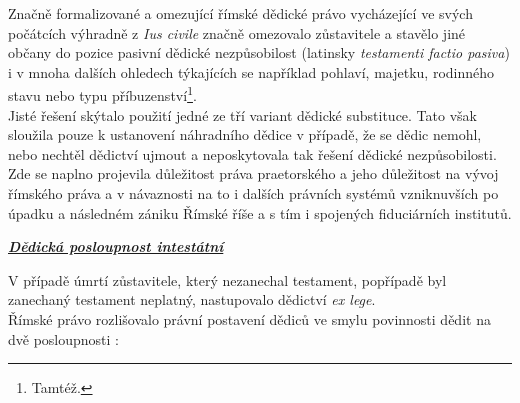 \documentclass{article}
\begin{document}
Značně formalizované a omezující římské dědické právo vycházející ve svých počátcích výhradně z \textit{Ius civile} značně omezovalo zůstavitele a stavělo jiné občany do pozice pasivní dědické nezpůsobilost (latinsky \textit{testamenti factio pasiva}) i v mnoha dalších ohledech týkajících se například pohlaví, majetku, rodinného stavu nebo typu příbuzenství\footnote{Tamtéž.}.\\

Jisté řešení skýtalo použití jedné ze tří variant dědické substituce. Tato však sloužila pouze k ustanovení náhradního dědice v případě, že se dědic nemohl, nebo nechtěl dědictví ujmout a neposkytovala tak řešení dědické nezpůsobilosti.\\

Zde se naplno projevila důležitost práva praetorského a jeho důležitost na vývoj římského práva a v návaznosti na to i dalších právních systémů vzniknuv\-ších po úpadku a následném zániku Římské říše a s tím i spojených fiduciárních institutů.\\

\newpage

\underline{\textbf{\textit{Dědická posloupnost intestátní}}}

\vspace*{5 mm}

V případě úmrtí zůstavitele, který nezanechal testament, popřípadě byl zanechaný testament neplatný, nastupovalo dědictví \textit{ex lege}.\\


Římské právo rozlišovalo právní postavení dědiců ve smylu povinnosti dědit na dvě posloupnosti :

\vspace{5 mm}
\end{document}
